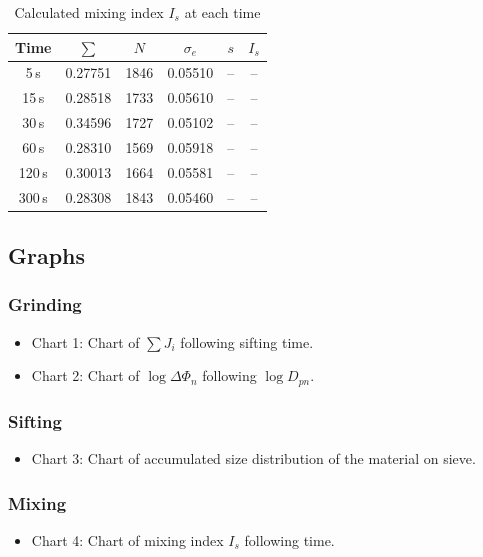 \begin{table}[H]
    \centering
    \caption{Calculated mixing index $I_s$ at each time}
    \begin{tabular}{cccccc}
        \hline
        \textbf{Time} & $\boldsymbol{\sum}$ & $N$ & $\sigma_e$ & $s$ & $I_s$ \\
        \hline
        5\,s   & 0.27751 & 1846 & 0.05510 & -- & -- \\
        15\,s  & 0.28518 & 1733 & 0.05610 & -- & -- \\
        30\,s  & 0.34596 & 1727 & 0.05102 & -- & -- \\
        60\,s  & 0.28310 & 1569 & 0.05918 & -- & -- \\
        120\,s & 0.30013 & 1664 & 0.05581 & -- & -- \\
        300\,s & 0.28308 & 1843 & 0.05460 & -- & -- \\
        \hline
    \end{tabular}
\end{table}

\subsection{Graphs}

\subsubsection{Grinding}
\begin{itemize}
    \item Chart 1: Chart of $\sum J_i$ following sifting time.
    \item Chart 2: Chart of $\log\Delta\varPhi_n$ following $\log D_{pn}$.
\end{itemize}

\subsubsection{Sifting}
\begin{itemize}
    \item Chart 3: Chart of accumulated size distribution of the material on sieve.
\end{itemize}

\subsubsection{Mixing}
\begin{itemize}
    \item Chart 4: Chart of mixing index $I_s$ following time.
\end{itemize}

